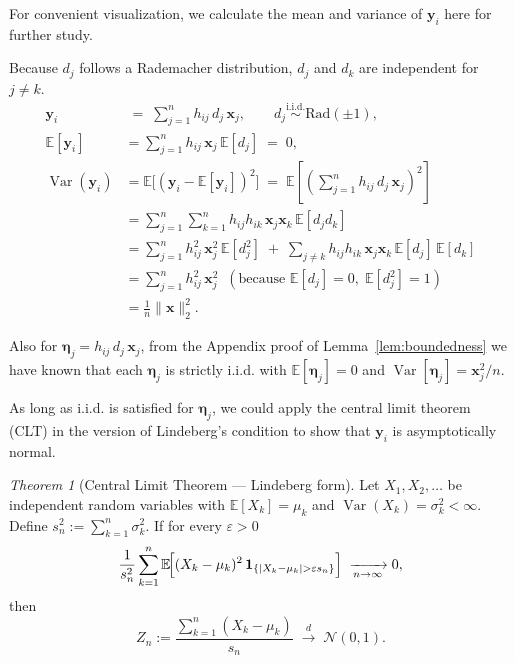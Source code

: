 \documentclass[11pt]{article}
\numberwithin{equation}{section}
\theoremstyle{plain}
\theoremstyle{definition}
\theoremstyle{remark}
\newtheorem{thm}[theorem]{Theorem}
\begin{document}
For convenient visualization, we calculate the mean and variance of $\mathbf{y}_{i}$ here for further study.

Because \( d_j \) follows a Rademacher distribution, \( d_j \) and \( d_k \) are independent for \( j \neq k \).
  \[
\begin{aligned}
\mathbf{y}_{i} & \;=\; \sum_{j=1}^{n} h_{ij}\,d_j\,\mathbf{x}_j, \qquad
     d_j \stackrel{\text{i.i.d.}}{\sim}\text{Rad}( \pm 1) ,\\[4pt]
\mathbb{E}[\mathbf{y}_{i}]
    &= \sum_{j=1}^{n} h_{ij}\,\mathbf{x}_j\,\mathbb{E}[d_j]
     \;=\; 0, \\[6pt]
\operatorname{Var}(\mathbf{y}_{i})
    &= \mathbb{E}\!\bigl[(\mathbf{y}_{i}-\mathbb{E}[\mathbf{y}_{i}])^{2}\bigr]
     \;=\; \mathbb{E}\!\left[\left(\sum_{j=1}^{n} h_{ij}\,d_j\,\mathbf{x}_j\right)^{\!2}\right] \\[4pt]
    &= \sum_{j=1}^{n}\sum_{k=1}^{n} h_{ij}h_{ik}\,\mathbf{x}_j\mathbf{x}_k\,\mathbb{E}[d_jd_k] \\[4pt]
    &= \sum_{j=1}^{n} h_{ij}^{2}\,\mathbf{x}_j^{2}\,\mathbb{E}[d_j^{2}]
     \;+\; \sum_{j\neq k} h_{ij}h_{ik}\,\mathbf{x}_j\mathbf{x}_k\,\mathbb{E}[d_j]\,\mathbb{E}[d_k] \\[4pt]
    &= \sum_{j=1}^{n} h_{ij}^{2}\,\mathbf{x}_j^{2}\;\;(\text{because } \mathbb{E}[d_j]=0,\;\mathbb{E}[d_j^{2}]=1) \\[6pt]
    &= \frac{1}{n} \|\mathbf{x}\|_2^2.
\end{aligned}
\]

Also for $\mathbf{\eta}_j = h_{ij}\,d_j\,\mathbf{x}_j$, from the Appendix proof of Lemma~\ref{lem:boundedness} we have known that each $\mathbf{\eta}_j$ is strictly i.i.d. with $\mathbb{E}[\mathbf{\eta}_j] = 0$ and $\operatorname{Var}[\mathbf{\eta}_j] = \mathbf{x}_j^2/n$.

As long as i.i.d. is satisfied for $\mathbf{\eta}_j$, we could apply the central limit theorem (CLT)  in the version of Lindeberg's condition to show that $\mathbf{y}_{i}$ is asymptotically normal.

\begin{thm}[Central Limit Theorem — Lindeberg form]
  \label{thm:CLT}
    Let \(X_1,X_2,\dots\) be independent random variables with
    \(
    \mathbb{E}[X_k]=\mu_k
    \)
    and
    \(
    \operatorname{Var}(X_k)=\sigma_k^{2}<\infty
    \).
    Define
    \(
    s_n^{2}:=\sum_{k=1}^{n}\sigma_k^{2}.
    \)
    If for every \(\varepsilon>0\)
    \[
    \frac{1}{s_n^{2}}\sum_{k=1}^{n}
    \mathbb{E}\!\Bigl[(X_k-\mu_k)^{2}\,
    \mathbf 1_{\{|X_k-\mu_k|>\varepsilon s_n\}}\Bigr]
    \;\xrightarrow[n\to\infty]{}0,
    \]
    then
    \[
    Z_n:=\frac{\sum_{k=1}^{n}(X_k-\mu_k)}{s_n}
    \;\xrightarrow{\;d\;}\;
    \mathcal N(0,1).
    \]
    \end{thm}
\end{document}

